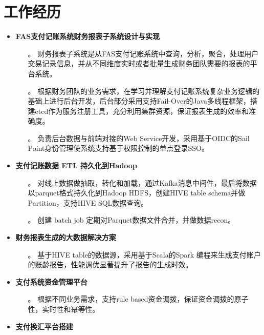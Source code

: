 \documentclass{resume}
\begin{document}
\section{工作经历}
\begin{itemize}
  \item \textbf{FAS支付记账系统财务报表子系统设计与实现}
  \begin{itemize}
    \item[。] 财务报表子系统是从FAS支付记账系统中查询，分析，聚合，处理用户交易记录信息，并从不同维度实时或者批量生成财务团队需要的报表的平台系统。
    \item[。] 根据财务团队的业务需求，在学习并理解支付记账系统复杂业务逻辑的基础上进行后台开发，后台部分采用支持Fail-Over的Java多线程框架，搭建etcd作为服务注册工具，充分利用集群资源，保证报表生成的效率和准确度。
    \item[。] 负责后台数据与前端对接的Web Service开发，采用基于OIDC的Sail Point身份管理使系统支持基于权限控制的单点登录SSO。
  \end{itemize}
  \item \textbf{支付记账数据 ETL 持久化到Hadoop}
  \begin{itemize}
    \item[。] 对线上数据做抽取，转化和加载，通过Kafka消息中间件，最后将数据以parquet格式持久化到Hadoop HDFS，创建HIVE table schema并做Partition，支持HIVE SQL数据查询。
    \item[。] 创建 batch job 定期对Parquet数据文件合并，并做数据recon。
  \end{itemize}
  \item \textbf{财务报表生成的大数据解决方案}
  \begin{itemize}
    \item[。] 基于HIVE table的数据源，采用基于Scala的Spark 编程来生成支付账户的账龄报告，性能调优显著提升了报告的生成时效。
  \end{itemize}
  \item \textbf{支付系统资金管理平台}
  \begin{itemize}
    \item[。] 根据不同业务需求，支持rule based资金调拨，保证资金调拨的原子性，实时性和幂等性。
  \end{itemize}
  \item \textbf{支付换汇平台搭建}
  \begin{itemize}

\end{itemize}
\end{itemize}
\end{document}
